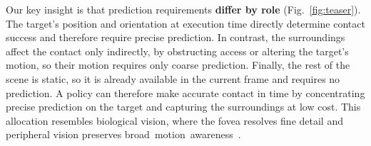 

Our key insight is that prediction requirements \textbf{differ by role} (Fig.~\ref{fig:teaser}). 
The target's position and orientation at execution time directly determine contact success and therefore require precise prediction. 
In contrast, the surroundings affect the contact only indirectly, by obstructing
access or altering the target's motion, so their motion requires only coarse
prediction. 
Finally, the rest of the scene is static, so it is already available in the current frame and requires no prediction. 
A policy can therefore make accurate contact in time by concentrating precise prediction on
the target and capturing the surroundings at low cost. 
This allocation resembles biological vision, where the fovea resolves fine detail and
peripheral vision preserves
\mbox{broad motion awareness~\cite{curcio1990photoreceptor,strasburger2011peripheral,rosenholtz2016peripheral}.}



